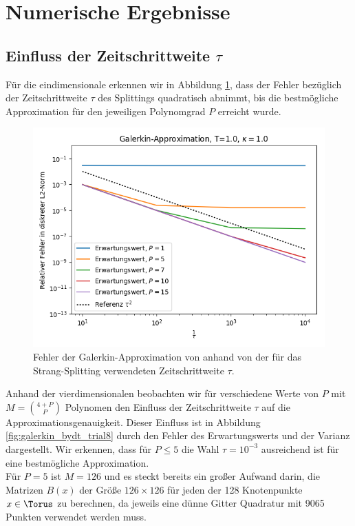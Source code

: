 \section{Numerische Ergebnisse}
\subsection{Einfluss der Zeitschrittweite $\tau$}
Für die eindimensionale  erkennen wir in Abbildung \ref{fig:galerkin_dt_convergence}, dass der Fehler bezüglich der Zeitschrittweite $\tau$ des Splittings quadratisch abnimmt, bis die bestmögliche Approximation für den jeweiligen Polynomgrad $P$ erreicht wurde.
\begin{figure}[!htb]
\centering
\includegraphics[width=\textwidth]{Figures/galerkin_trial3_splitting_convergence.png}
\caption{Fehler der Galerkin-Approximation von  anhand von der für das Strang-Splitting verwendeten Zeitschrittweite $\tau$.}
\label{fig:galerkin_dt_convergence}
\end{figure}
Anhand der vierdimensionalen  beobachten wir für verschiedene Werte von $P$ mit $M=\binom{4+P}{P}$ Polynomen den Einfluss der Zeitschrittweite $\tau$ auf die Approximationsgenauigkeit. Dieser Einfluss ist in Abbildung \ref{fig:galerkin_bydt_trial8} durch den Fehler des Erwartungswerts und der Varianz dargestellt. Wir erkennen, dass für $P\le 5$ die Wahl $\tau=10^{-3}$ ausreichend ist für eine bestmögliche Approximation.\\
Für $P=5$ ist $M=126$ und es steckt bereits ein großer Aufwand darin, die Matrizen $B(x)$ der Größe $126\times 126$ für jeden der 128 Knotenpunkte $x\in\Torus$ zu berechnen, da jeweils eine dünne Gitter Quadratur mit 9065 Punkten verwendet werden muss.
